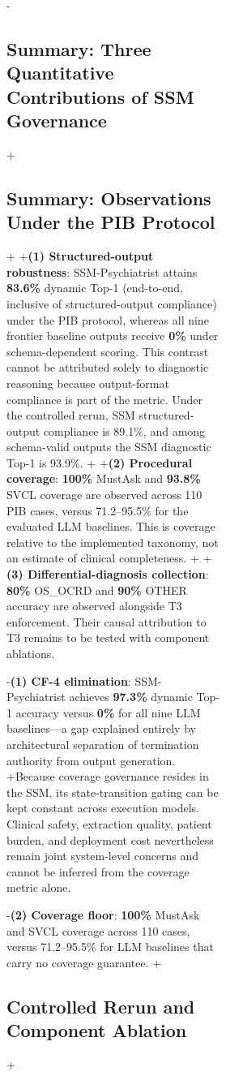 \begin{figure}[t]
{\begin{figure}[!t]
{\begin{figure}[!t]
{-\subsection{Summary: Three Quantitative Contributions of SSM Governance}
+\subsection{Summary: Observations Under the PIB Protocol}
+
+\textbf{(1) Structured-output robustness}: SSM-Psychiatrist attains \textbf{83.6\%} dynamic Top-1 (end-to-end, inclusive of structured-output compliance) under the PIB protocol, whereas all nine frontier baseline outputs receive \textbf{0\%} under schema-dependent scoring. This contrast cannot be attributed solely to diagnostic reasoning because output-format compliance is part of the metric. Under the controlled rerun, SSM structured-output compliance is 89.1\%, and among schema-valid outputs the SSM diagnostic Top-1 is 93.9\%.
+
+\textbf{(2) Procedural coverage}: \textbf{100\%} MustAsk and \textbf{93.8\%} SVCL coverage are observed across 110 PIB cases, versus 71.2--95.5\% for the evaluated LLM baselines. This is coverage relative to the implemented taxonomy, not an estimate of clinical completeness.
+
+\textbf{(3) Differential-diagnosis collection}: \textbf{80\%} OS\_OCRD and \textbf{90\%} OTHER accuracy are observed alongside T3 enforcement. Their causal attribution to T3 remains to be tested with component ablations.
 
-\textbf{(1) CF-4 elimination}: SSM-Psychiatrist achieves \textbf{97.3\%} dynamic Top-1 accuracy versus \textbf{0\%} for all nine LLM baselines---a gap explained entirely by architectural separation of termination authority from output generation.
+Because coverage governance resides in the SSM, its state-transition gating can be kept constant across execution models. Clinical safety, extraction quality, patient burden, and deployment cost nevertheless remain joint system-level concerns and cannot be inferred from the coverage metric alone.
 
-\textbf{(2) Coverage floor}: \textbf{100\%} MustAsk and SVCL coverage across 110 cases, versus 71.2--95.5\% for LLM baselines that carry no coverage guarantee.
+\subsection{Controlled Rerun and Component Ablation}
+\label{sec:controlled_rerun}
 
}
\end{figure}}
\end{figure}}
\end{figure}
